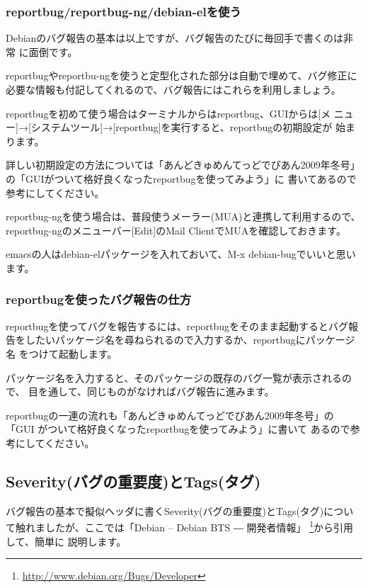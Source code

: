 \documentclass[mingoth,a4paper]{jsarticle}
\begin{document}
\subsubsection{reportbug/reportbug-ng/debian-elを使う}
Debianのバグ報告の基本は以上ですが、バグ報告のたびに毎回手で書くのは非常
に面倒です。

reportbugやreportbu-ngを使うと定型化された部分は自動で埋めて、バグ修正に
必要な情報も付記してくれるので、バグ報告にはこれらを利用しましょう。

reportbugを初めて使う場合はターミナルからはreportbug、GUIからは[メ
ニュー]→[システムツール]→[reportbug]を実行すると、reportbugの初期設定が
始まります。

詳しい初期設定の方法については「あんどきゅめんてっどでびあん2009年冬号」
の「GUIがついて格好良くなったreportbugを使ってみよう」\cite{nogata2009}に
書いてあるので参考にしてください。

reportbug-ngを使う場合は、普段使うメーラー(MUA)と連携して利用するので、
reportbug-ngのメニューバー[Edit]のMail ClientでMUAを確認しておきます。

emacsの人はdebian-elパッケージを入れておいて、M-x debian-bugでいいと思い
ます。

\subsubsection{reportbugを使ったバグ報告の仕方}

reportbugを使ってバグを報告するには、reportbugをそのまま起動するとバグ報
告をしたいパッケージ名を尋ねられるので入力するか、reportbugにパッケージ名
をつけて起動します。


パッケージ名を入力すると、そのパッケージの既存のバグ一覧が表示されるので、
目を通して、同じものがなければバグ報告に進みます。

reportbugの一連の流れも「あんどきゅめんてっどでびあん2009年冬号」の「GUI
がついて格好良くなったreportbugを使ってみよう」\cite{nogata2009}に書いて
あるので参考にしてください。

\subsection{Severity(バグの重要度)とTags(タグ)}
バグ報告の基本で擬似ヘッダに書くSeverity(バグの重要度)とTags(タグ)につい
て触れましたが、ここでは「Debian -- Debian BTS ― 開発者情報」
\footnote{\url{http://www.debian.org/Bugs/Developer}}から引用して、簡単に
説明します。
\end{document}

